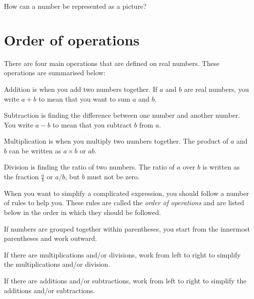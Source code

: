 \documentclass[a4paper,oneside,12pt]{article}
\begin{document}

\begin{exercise}
How can a number be represented as a picture?
\end{exercise}




\section{Order of operations}

There are four main operations that are defined on real numbers.
These operations are summarised below:
\begin{packedenumeral}
\item Addition is when you add two numbers together.  If $a$ and $b$
  are real numbers, you write $a + b$ to mean that you want to sum $a$
  and $b$.

\item Subtraction is finding the difference between one number and
  another number.  You write $a - b$ to mean that you subtract $b$
  from $a$.

\item Multiplication is when you multiply two numbers together.  The
  product of $a$ and $b$ can be written as $a \times b$ or $ab$.

\item Division is finding the ratio of two numbers.  The ratio of $a$
  over $b$ is written as the fraction $\frac{a}{b}$ or $a/b$, but $b$
  must not be zero.
\end{packedenumeral}

When you want to simplify a complicated expression, you should follow
a number of rules to help you.  These rules are called the
\emph{order of operations} and are listed below in the order in which
they should be followed.
\begin{packedenumeral}
\item If numbers are grouped together within parentheses, you start
  from the innermost parentheses and work outward.

\item If there are multiplications and/or divisions, work from left to
  right to simplify the multiplications and/or division.

\item If there are additions and/or subtractions, work from left to
  right to simplify the additions and/or subtractions.
\end{packedenumeral}
\end{document}
